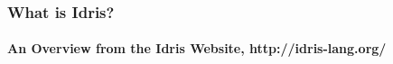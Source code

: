 \begin{frame}[fragile]
\frametitle{What is Idris?}
\framesubtitle{An Overview from the Idris Website, http://idris-lang.org/}

\end{frame}
